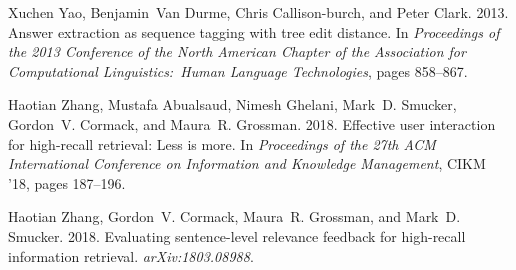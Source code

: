 \documentclass[11pt,a4paper]{article}
\begin{document}
\begin{thebibliography}{26}
Xuchen Yao, Benjamin~Van Durme, Chris Callison-burch, and Peter Clark. 2013.
\newblock Answer extraction as sequence tagging with tree edit distance.
\newblock In \emph{Proceedings of the 2013 Conference of the North American
  Chapter of the Association for Computational Linguistics:\ Human Language
  Technologies}, pages 858--867.

Haotian Zhang, Mustafa Abualsaud, Nimesh Ghelani, Mark~D. Smucker, Gordon~V.
  Cormack, and Maura~R. Grossman. 2018{}.
\newblock Effective user interaction for high-recall retrieval: Less is more.
\newblock In \emph{Proceedings of the 27th ACM International Conference on
  Information and Knowledge Management}, CIKM '18, pages 187--196.

Haotian Zhang, Gordon~V. Cormack, Maura~R. Grossman, and Mark~D. Smucker.
  2018{}.
\newblock Evaluating sentence-level relevance feedback for high-recall
  information retrieval.
\newblock \emph{arXiv:1803.08988}.

\end{thebibliography}
\end{document}
